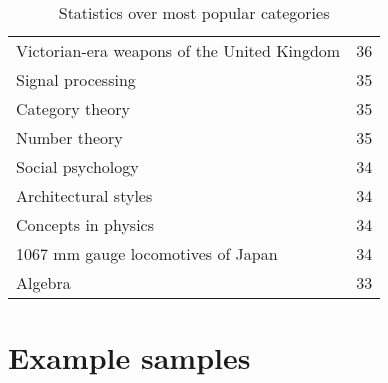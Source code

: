 \begin{appendices}
\begin{table}[h!]
\begin{tabular} {|| p{20em} | p{5em} ||}
Victorian-era weapons of the United Kingdom & 36 \\
Signal processing & 35 \\
Category theory & 35 \\
Number theory & 35 \\
Social psychology & 34 \\
Architectural styles & 34 \\
Concepts in physics & 34 \\
1067 mm gauge locomotives of Japan & 34 \\
Algebra & 33 \\
 \hline
\end{tabular}
\caption{Statistics over most popular categories}
\label{table:A.1}
\end{table}

\chapter{Example samples}







\end{appendices}
